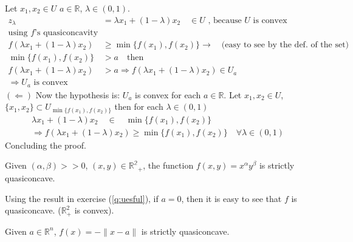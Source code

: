 \documentclass[answers]{exam}
\theoremstyle{definition}
\begin{document}
\begin{questions}
\begin{solution}
        Let $x_1, x_2\in U$ $a\in\mathds{R}$, $\lambda \in(0,1)$.
        \begin{align*}
            z_\lambda&=\lambda x_1+(1-\lambda)x_2 \quad \in U\text{ , because $U$ is convex}\\
            \text{using $f$'s quasiconcavity}\\
            f(\lambda x_1+(1-\lambda)x_2)&\geq\min\{f(x_1),f(x_2)\}\rightarrow\quad\text{(easy to see by the def. of the set)}\\
            \min\{f(x_1),f(x_2)\}&>a\quad\text{then}\\
            f(\lambda x_1+(1-\lambda)x_2)&>a\Rightarrow f(\lambda x_1+(1-\lambda)x_2)\in U_a\\
            \Rightarrow U_a\text{ is convex}
        \end{align*}
        $(\Leftarrow)$ Now the hypothesis is: $U_a$ is convex for each $a\in\mathds{R}$.
        Let $x_1,x_2\in U$, $\{x_1,x_2\}\subset U_{\min\{f(x_1),f(x_2)\}}$ then for each $\lambda \in (0,1)$
        \begin{align*}
            \lambda x_1+(1-\lambda)x_2\quad \in \quad \min\{f(x_1),f(x_2)\}\\
            \Rightarrow f(\lambda x_1+(1-\lambda)x_2)\geq\min\{f(x_1),f(x_2)\}\quad\forall \lambda\in(0,1)
        \end{align*}
        Concluding the proof.

        \end{solution}

        \question Given $(\alpha,\beta)>>0$, $(x,y)\in\mathds{R^2}_+$, the function $f(x,y)=x^\alpha y^\beta$ is strictly quasiconcave.
        
            \begin{solution}
            Using the result in exercise (\ref{q:uesful}), if $a=0$, then it is easy to see that $f$ is quasiconcave. ($\mathds{R}^2_+$ is convex).
            \end{solution}

        \question Given $a\in\mathds{R}^n$, $f(x)=-\parallel x-a\parallel$ is strictly quasiconcave.


\end{questions}
\end{document}
